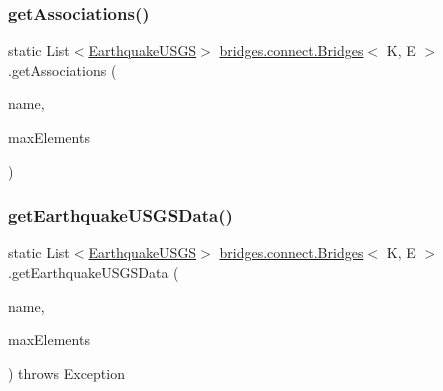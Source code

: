 \hypertarget{classbridges_1_1connect_1_1_bridges_ac02211d6205c1270df11fcc271982d40}{}\label{classbridges_1_1connect_1_1_bridges_ac02211d6205c1270df11fcc271982d40} 
\subsubsection{\texorpdfstring{get\+Associations()}{getAssociations()}\hspace{0.1cm}{\footnotesize\ttfamily [2/2]}}
{\footnotesize\ttfamily static List$<$\hyperlink{classbridges_1_1data__src__dependent_1_1_earthquake_u_s_g_s}{Earthquake\+U\+S\+GS}$>$ \hyperlink{classbridges_1_1connect_1_1_bridges}{bridges.\+connect.\+Bridges}$<$ K, E $>$.get\+Associations (\begin{DoxyParamCaption}\item[{\hyperlink{classbridges_1_1data__src__dependent_1_1_u_s_g_saccount}{U\+S\+G\+Saccount}}]{name,  }\item[{int}]{max\+Elements }\end{DoxyParamCaption})\hspace{0.3cm}{\ttfamily [static]}}

\hypertarget{classbridges_1_1connect_1_1_bridges_afd68bf25a3f61e731f603da67fbdcecc}{}\label{classbridges_1_1connect_1_1_bridges_afd68bf25a3f61e731f603da67fbdcecc} 
\subsubsection{\texorpdfstring{get\+Earthquake\+U\+S\+G\+S\+Data()}{getEarthquakeUSGSData()}}
{\footnotesize\ttfamily static List$<$\hyperlink{classbridges_1_1data__src__dependent_1_1_earthquake_u_s_g_s}{Earthquake\+U\+S\+GS}$>$ \hyperlink{classbridges_1_1connect_1_1_bridges}{bridges.\+connect.\+Bridges}$<$ K, E $>$.get\+Earthquake\+U\+S\+G\+S\+Data (\begin{DoxyParamCaption}\item[{\hyperlink{classbridges_1_1data__src__dependent_1_1_u_s_g_saccount}{U\+S\+G\+Saccount}}]{name,  }\item[{int}]{max\+Elements }\end{DoxyParamCaption}) throws Exception\hspace{0.3cm}{\ttfamily [static]}}

